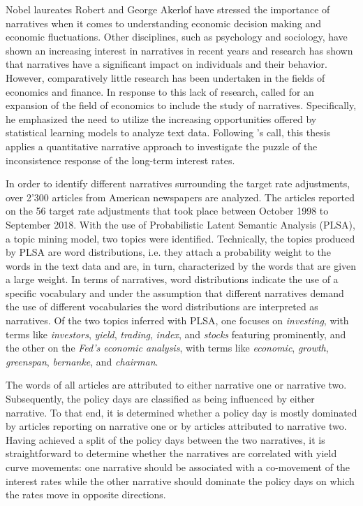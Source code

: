 \documentclass[11pt,a4paper,english,oneside]{book}
\numberwithin{equation}{chapter}
\begin{document}
Nobel laureates Robert \citeauthor{Shiller.2017} and George Akerlof have stressed the importance of narratives when it comes to understanding economic decision making and economic fluctuations. Other disciplines, such as psychology and sociology, have shown an increasing interest in narratives in recent years and research has shown that narratives have a significant impact on individuals and their behavior. However, comparatively little research has been undertaken in the fields of economics and finance. In response to this lack of research, \citeauthor{Shiller.2017} called for an expansion of the field of economics to include the study of narratives. Specifically, he emphasized the need to utilize the increasing opportunities offered by statistical learning models to analyze text data.
Following \citeauthor{Shiller.2017}'s call, this thesis applies a quantitative narrative approach to investigate the puzzle of the inconsistence response of the long-term interest rates.

In order to identify different narratives surrounding the target rate adjustments, over 2'300 articles from American newspapers are analyzed. The articles reported on the 56 target rate adjustments that took place between October 1998 to September 2018. With the use of Probabilistic Latent Semantic Analysis (PLSA), a topic mining model, two topics were identified. Technically, the topics produced by PLSA are word distributions, i.e. they attach a probability weight to the words in the text data and are, in turn, characterized by the words that are given a large weight. In terms of narratives, word distributions indicate the use of a specific vocabulary and under the assumption that different narratives demand the use of different vocabularies the word distributions are interpreted as narratives. Of the two topics inferred with PLSA, one focuses on \textit{investing}, with terms like \textit{investors}, \textit{yield}, \textit{trading}, \textit{index}, and \textit{stocks} featuring prominently, and the other on the \textit{Fed's economic analysis}, with terms like \textit{economic}, \textit{growth}, \textit{greenspan}, \textit{bernanke}, and \textit{chairman}. 

The words of all articles are attributed to either narrative one or narrative two. Subsequently, the policy days are classified as being influenced by either narrative. To that end, it is determined whether a policy day is mostly dominated by articles reporting on narrative one or by articles attributed to narrative two. Having achieved a split of the policy days between the two narratives, it is straightforward to determine whether the narratives are correlated with yield curve movements: one narrative should be associated with a co-movement of the interest rates while the other narrative should dominate the policy days on which the rates move in opposite directions. 
\end{document}
